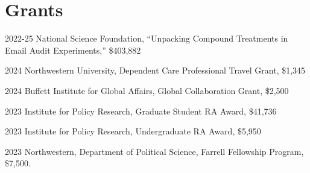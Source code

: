     \section*{Grants}
	\begin{tablist}
	\item[2022-25]	\tab{}National Science Foundation, ``Unpacking Compound Treatments in Email Audit Experiments,'' \$403,882
		\item[2024] \tab{}Northwestern University, Dependent Care Professional Travel Grant, \$1,345
	\item[2024] \tab{}Buffett Institute for Global Affairs, Global Collaboration Grant, \$2,500
	\item[2023] \tab{}Institute for Policy Research, Graduate Student RA Award, \$41,736 
	\item[2023]	\tab{}Institute for Policy Research, Undergraduate RA Award, \$5,950
	\item[2023]	\tab{}Northwestern, Department of Political Science, Farrell Fellowship Program, \$7,500.
	\end{tablist}
	